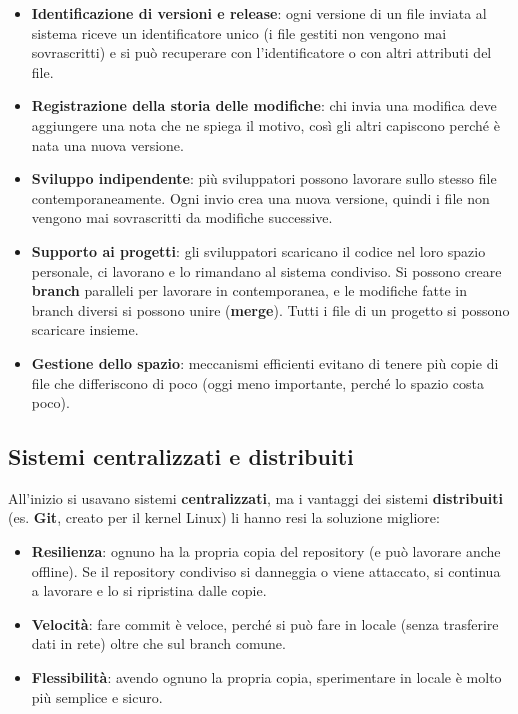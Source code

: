 \begin{itemize}
\tightlist
\item
  \textbf{Identificazione di versioni e release}: ogni versione di un
  file inviata al sistema riceve un identificatore unico (i file gestiti
  non vengono mai sovrascritti) e si può recuperare con l'identificatore
  o con altri attributi del file.
\item
  \textbf{Registrazione della storia delle modifiche}: chi invia una
  modifica deve aggiungere una nota che ne spiega il motivo, così gli
  altri capiscono perché è nata una nuova versione.
\item
  \textbf{Sviluppo indipendente}: più sviluppatori possono lavorare
  sullo stesso file contemporaneamente. Ogni invio crea una nuova
  versione, quindi i file non vengono mai sovrascritti da modifiche
  successive.
\item
  \textbf{Supporto ai progetti}: gli sviluppatori scaricano il codice
  nel loro spazio personale, ci lavorano e lo rimandano al sistema
  condiviso. Si possono creare \textbf{branch} paralleli per lavorare in
  contemporanea, e le modifiche fatte in branch diversi si possono unire
  (\textbf{merge}). Tutti i file di un progetto si possono scaricare
  insieme.
\item
  \textbf{Gestione dello spazio}: meccanismi efficienti evitano di
  tenere più copie di file che differiscono di poco (oggi meno
  importante, perché lo spazio costa poco).
\end{itemize}

\subsection{Sistemi centralizzati e
distribuiti}\label{sistemi-centralizzati-e-distribuiti}

All'inizio si usavano sistemi \textbf{centralizzati}, ma i vantaggi dei
sistemi \textbf{distribuiti} (es. \textbf{Git}, creato per il kernel
Linux) li hanno resi la soluzione migliore:

\begin{itemize}
\tightlist
\item
  \textbf{Resilienza}: ognuno ha la propria copia del repository (e può
  lavorare anche offline). Se il repository condiviso si danneggia o
  viene attaccato, si continua a lavorare e lo si ripristina dalle
  copie.
\item
  \textbf{Velocità}: fare commit è veloce, perché si può fare in locale
  (senza trasferire dati in rete) oltre che sul branch comune.
\item
  \textbf{Flessibilità}: avendo ognuno la propria copia, sperimentare in
  locale è molto più semplice e sicuro.
\end{itemize}

